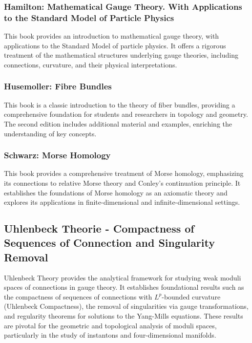 \documentclass[10pt, letterpaper]{article}
\begin{document}
\subsubsection{Hamilton: Mathematical Gauge Theory. With Applications to the Standard
Model of Particle Physics \cite{hamilton2017gauge}}
This book provides an introduction to mathematical gauge theory, with applications to the Standard Model of particle physics. It offers a rigorous treatment of the mathematical structures underlying gauge theories, including connections, curvature, and their physical interpretations.


\subsubsection{Husemoller: Fibre Bundles \cite{husemoller1975fibre}}
This book is a classic introduction to the theory of fiber bundles, providing a comprehensive foundation for students and researchers in topology and geometry. The second edition includes additional material and examples, enriching the understanding of key concepts.


\subsubsection{Schwarz: Morse Homology \cite{schwarz1993morse}}
This book provides a comprehensive treatment of Morse homology, emphasizing its connections to relative Morse theory and Conley's continuation principle. It establishes the foundations of Morse homology as an axiomatic theory and explores its applications in finite-dimensional and infinite-dimensional settings.

\subsection{Uhlenbeck Theorie - Compactness of Sequences of Connection and Singularity Removal} Uhlenbeck Theory provides the analytical framework for studying weak moduli spaces of connections in gauge theory. It establishes foundational results such as the compactness of sequences of connections with $L^p$-bounded curvature (Uhlenbeck Compactness), the removal of singularities via gauge transformations, and regularity theorems for solutions to the Yang-Mills equations. These results are pivotal for the geometric and topological analysis of moduli spaces, particularly in the study of instantons and four-dimensional manifolds.
\end{document}
